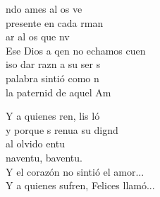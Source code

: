 \documentclass[12pt]{article}
\begin{document}
\begin{multicols*}{2}
\begin{cancion}
	ndo ames al os  ve\\
	presente en cada rman \\
	ar al os que nv   \\
	Ese Dios a qen no echamos cuen\\
	iso dar razn a su ser s\\
	palabra sintió como n  \\
	la paternid de aquel Am \\
	\begin{chorus}%
	Y a quienes ren, lis ló \\
	y porque s renua su dignd\\
	al olvido entu\\
	naventu, baventu.  \\
	Y el corazón no sintió el amor...\\
	Y a quienes sufren, Felices llamó...\\
	\end{chorus}%
\end{cancion}%


\end{multicols*}
\end{document}
